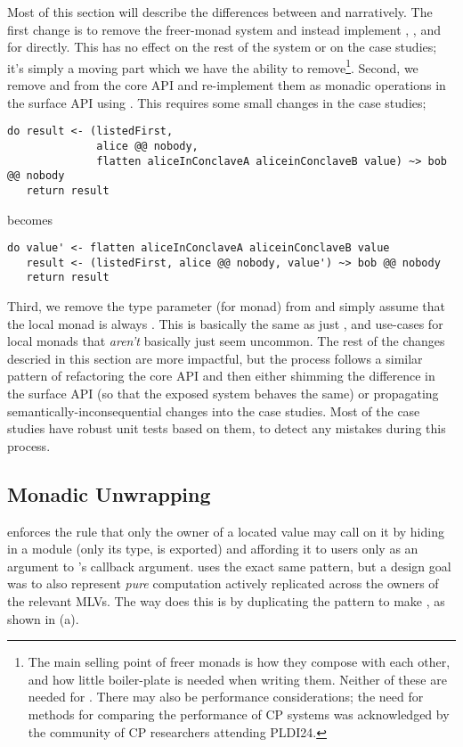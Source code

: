 Most of this section will describe the differences between \MultiChor and \minichor narratively.
The first change is to remove the freer-monad system and instead implement , , and 
for  directly.
This has no effect on the rest of the system or on the case studies;
it's simply a moving part which we have the ability to remove\footnote{
	The main selling point of freer monads is how they compose with each other,
	and how little boiler-plate is needed when writing them.
	Neither of these are needed for \minichor.
	There may also be performance considerations;
	the need for methods for comparing the performance of CP systems was acknowledged by the community
  of CP researchers attending PLDI24.
	}.
Second, we remove  and  from the core API and re-implement them as
monadic operations in the surface API using .
This requires some small changes in the case studies; \eg
\begin{verbatim}
do result <- (listedFirst,
              alice @@ nobody,
              flatten aliceInConclaveA aliceinConclaveB value) ~> bob @@ nobody
   return result
\end{verbatim}
becomes
\begin{verbatim}
do value' <- flatten aliceInConclaveA aliceinConclaveB value
   result <- (listedFirst, alice @@ nobody, value') ~> bob @@ nobody
   return result
\end{verbatim}
Third, we remove the type parameter  (for monad) from 
and simply assume that the local monad is always .
This is basically the same as just , and use-cases for local monads that \emph{aren't} basically just 
seem uncommon.
The rest of the changes descried in this section are more impactful,
but the process follows a similar pattern of refactoring the core API and then either shimming the difference in the surface API
(so that the exposed system behaves the same)
or propagating semantically-inconsequential changes into the case studies.
Most of the case studies have robust unit tests based on them, to detect any mistakes during this process.

\subsection{Monadic Unwrapping}
\HasChor enforces the rule that only the owner of a located value may call  on it
by hiding  in a module (only its type,  is exported)
and affording it to users only as an argument to 's callback argument.
\MultiChor uses the exact same pattern, but a design goal was to also represent \emph{pure} computation
actively replicated across the owners of the relevant MLVs.
The way \MultiChor does this is by duplicating the  pattern
to make ,
as shown in (a).

